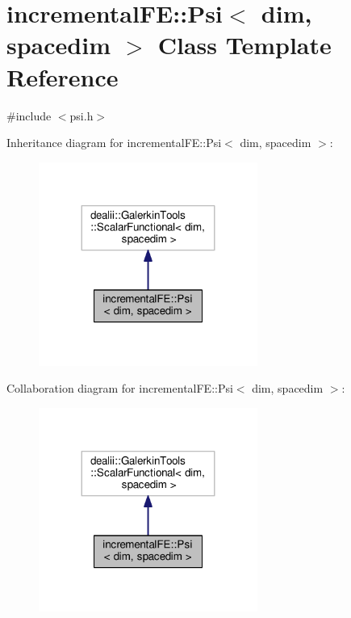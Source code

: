 \hypertarget{classincremental_f_e_1_1_psi}{}\section{incremental\+FE\+:\+:Psi$<$ dim, spacedim $>$ Class Template Reference}
\label{classincremental_f_e_1_1_psi}


{\ttfamily \#include $<$psi.\+h$>$}



Inheritance diagram for incremental\+FE\+:\+:Psi$<$ dim, spacedim $>$\+:\nopagebreak
\begin{figure}[H]
\begin{center}
\leavevmode
\includegraphics[width=203pt]{classincremental_f_e_1_1_psi__inherit__graph}
\end{center}
\end{figure}


Collaboration diagram for incremental\+FE\+:\+:Psi$<$ dim, spacedim $>$\+:\nopagebreak
\begin{figure}[H]
\begin{center}
\leavevmode
\includegraphics[width=203pt]{classincremental_f_e_1_1_psi__coll__graph}
\end{center}
\end{figure}
